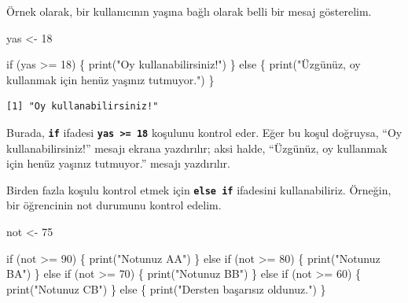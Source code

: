 \documentclass[
  letterpaper,
  DIV=11,
  numbers=noendperiod]{scrreprt}
\newenvironment{Shaded}{\begin{snugshade}}{\end{snugshade}}
\newcommand{\ControlFlowTok}[1]{\textcolor[rgb]{0.00,0.23,0.31}{#1}}
\newcommand{\DecValTok}[1]{\textcolor[rgb]{0.68,0.00,0.00}{#1}}
\newcommand{\FunctionTok}[1]{\textcolor[rgb]{0.28,0.35,0.67}{#1}}
\newcommand{\NormalTok}[1]{\textcolor[rgb]{0.00,0.23,0.31}{#1}}
\newcommand{\OtherTok}[1]{\textcolor[rgb]{0.00,0.23,0.31}{#1}}
\newcommand{\SpecialCharTok}[1]{\textcolor[rgb]{0.37,0.37,0.37}{#1}}
\newcommand{\StringTok}[1]{\textcolor[rgb]{0.13,0.47,0.30}{#1}}
\begin{document}
Örnek olarak, bir kullanıcının yaşına bağlı olarak belli bir mesaj
gösterelim.

\begin{Shaded}
\begin{Highlighting}[]
\NormalTok{yas }\OtherTok{\textless{}{-}} \DecValTok{18}

\ControlFlowTok{if}\NormalTok{ (yas }\SpecialCharTok{\textgreater{}=} \DecValTok{18}\NormalTok{) \{}
  \FunctionTok{print}\NormalTok{(}\StringTok{"Oy kullanabilirsiniz!"}\NormalTok{)}
\NormalTok{\} }\ControlFlowTok{else}\NormalTok{ \{}
  \FunctionTok{print}\NormalTok{(}\StringTok{"Üzgünüz, oy kullanmak için henüz yaşınız tutmuyor."}\NormalTok{)}
\NormalTok{\}}
\end{Highlighting}
\end{Shaded}

\begin{verbatim}
[1] "Oy kullanabilirsiniz!"
\end{verbatim}

Burada, \textbf{\texttt{if}} ifadesi
\textbf{\texttt{yas\ \textgreater{}=\ 18}} koşulunu kontrol eder. Eğer
bu koşul doğruysa, ``Oy kullanabilirsiniz!'' mesajı ekrana yazdırılır;
aksi halde, ``Üzgünüz, oy kullanmak için henüz yaşınız tutmuyor.''
mesajı yazdırılır.

Birden fazla koşulu kontrol etmek için \textbf{\texttt{else\ if}}
ifadesini kullanabiliriz. Örneğin, bir öğrencinin not durumunu kontrol
edelim.

\begin{Shaded}
\begin{Highlighting}[]
\NormalTok{not }\OtherTok{\textless{}{-}} \DecValTok{75}

\ControlFlowTok{if}\NormalTok{ (not }\SpecialCharTok{\textgreater{}=} \DecValTok{90}\NormalTok{) \{}
  \FunctionTok{print}\NormalTok{(}\StringTok{"Notunuz AA"}\NormalTok{)}
\NormalTok{\} }\ControlFlowTok{else} \ControlFlowTok{if}\NormalTok{ (not }\SpecialCharTok{\textgreater{}=} \DecValTok{80}\NormalTok{) \{}
  \FunctionTok{print}\NormalTok{(}\StringTok{"Notunuz BA"}\NormalTok{)}
\NormalTok{\} }\ControlFlowTok{else} \ControlFlowTok{if}\NormalTok{ (not }\SpecialCharTok{\textgreater{}=} \DecValTok{70}\NormalTok{) \{}
  \FunctionTok{print}\NormalTok{(}\StringTok{"Notunuz BB"}\NormalTok{)}
\NormalTok{\} }\ControlFlowTok{else} \ControlFlowTok{if}\NormalTok{ (not }\SpecialCharTok{\textgreater{}=} \DecValTok{60}\NormalTok{) \{}
  \FunctionTok{print}\NormalTok{(}\StringTok{"Notunuz CB"}\NormalTok{)}
\NormalTok{\} }\ControlFlowTok{else}\NormalTok{ \{}
  \FunctionTok{print}\NormalTok{(}\StringTok{"Dersten başarısız oldunuz."}\NormalTok{)}
\NormalTok{\}}
\end{Highlighting}
\end{Shaded}
\end{document}
